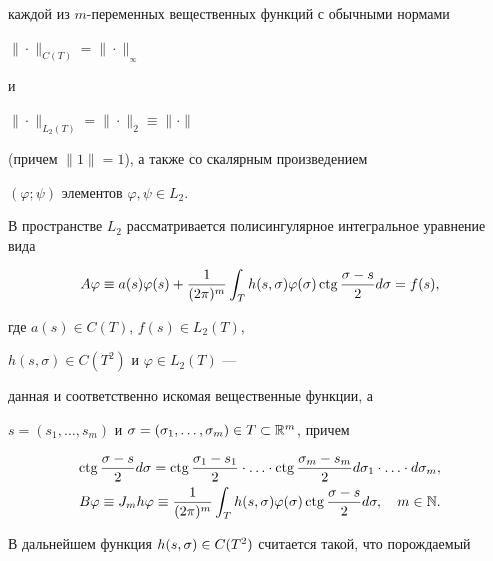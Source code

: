каждой из $m$-пе\-ре\-менных вещественных функций с обычными нормами


$\|\cdot\|_{C(T)}=\|\cdot\|_{{}_\infty}$


и


$\|\cdot\|_{L_2(T)}=\|\cdot\|_2\equiv \|\cdot\|$


(причем $ \|1\|=1 $), а также со скалярным произведением


$(\varphi; \psi )$ элементов $\varphi, \psi \in L_2$.





В пространстве $L_2$ рассматривается полисингулярное интегральное уравнение вида


\begin{equation}


A\varphi \equiv a(s)\varphi (s)+\frac{1}{(2\pi )^m}


\int_T h(s,\sigma ) \varphi (\sigma )\ctg


\frac{\sigma -s}{2} d\sigma =f(s),


\end{equation}


где $a(s)\in C(T)$, $f(s)\in L_2(T)$, 


$h(s,\sigma )\in C(T^2)$ и $\varphi \in L_2(T)$ ---


данная и соответственно искомая вещественные функции, а


$s=(s_1,\dotsc,s_m)$ и $ \sigma =


(\sigma _1,\dotsc,\sigma _m)\in T\subset \Bbb{R}^m $, причем


\begin{gather*}


\ctg\frac{\sigma -s}{2} d\sigma =\ctg


\frac{\sigma _1-s_1}{2}\cdot \dotsc \cdot \ctg


\frac{\sigma _m-s_m}{2} d\sigma _1\cdot \dotsc \cdot d\sigma _m,\\


%


B\varphi\equiv J_mh\varphi \equiv \frac{1}{(2\pi )^m}\int_Th(s,\sigma )


\varphi (\sigma )\ctg\frac{\sigma -s}{2} d\sigma,


\quad m\in \Bbb{N} .


\end{gather*}





В дальнейшем функция $h(s,\sigma)\in C(T^2)$ считается такой, что порождаемый 


